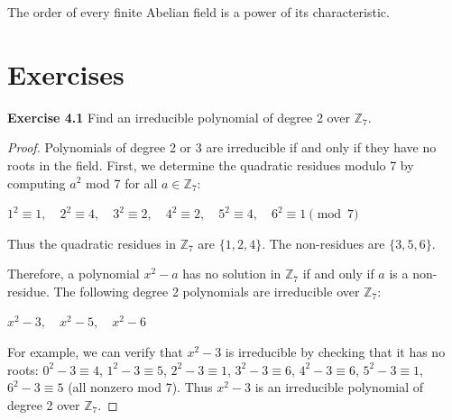 \documentclass[a4paper]{article}
\begin{document}
\begin{theorem}
The order of every finite Abelian field is a power of its characteristic.
\end{theorem}



\section{Exercises}
\noindent \textbf{Exercise 4.1} Find an irreducible polynomial of degree 2 over $\mathbb{Z}_{7}$.
\begin{proof}
Polynomials of degree 2 or 3 are irreducible if and only if they have no roots in the field. First, we determine the quadratic residues modulo 7 by computing $a^2$ mod 7 for all $a \in \mathbb{Z}_7$:
\begin{center}
$1^2 \equiv 1, \quad 2^2 \equiv 4, \quad 3^2 \equiv 2, \quad 4^2 \equiv 2, \quad 5^2 \equiv 4, \quad 6^2 \equiv 1 \pmod{7}$
\end{center}
Thus the quadratic residues in $\mathbb{Z}_7$ are $\{1, 2, 4\}$. The non-residues are $\{3, 5, 6\}$.

Therefore, a polynomial $x^2 - a$ has no solution in $\mathbb{Z}_7$ if and only if $a$ is a non-residue. The following degree 2 polynomials are irreducible over $\mathbb{Z}_7$:
\begin{center}
$x^2 - 3, \quad x^2 - 5, \quad x^2 - 6$
\end{center}
For example, we can verify that $x^2 - 3$ is irreducible by checking that it has no roots: $0^2 - 3 \equiv 4$, $1^2 - 3 \equiv 5$, $2^2 - 3 \equiv 1$, $3^2 - 3 \equiv 6$, $4^2 - 3 \equiv 6$, $5^2 - 3 \equiv 1$, $6^2 - 3 \equiv 5$ (all nonzero mod 7). Thus $x^2 - 3$ is an irreducible polynomial of degree 2 over $\mathbb{Z}_7$.
\end{proof}
\end{document}
